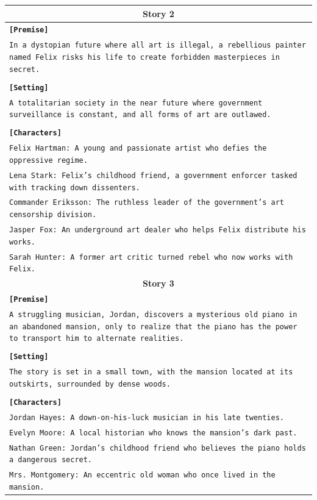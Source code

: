 \documentclass[letterpaper]{article} %
\begin{document}
\begin{small}
\begin{longtable}{p{\textwidth}}
    \multicolumn{1}{c}{\textbf{Story 2}} \\
    \midrule
    \texttt{\textbf{[Premise]}} \\
    \texttt{In a dystopian future where all art is illegal, a rebellious painter named Felix risks his life to create forbidden masterpieces in secret.} \\\\
    \texttt{\textbf{[Setting]}} \\
    \texttt{A totalitarian society in the near future where government surveillance is constant, and all forms of art are outlawed.} \\\\
    \texttt{\textbf{[Characters]}} \\
    \texttt{Felix Hartman: A young and passionate artist who defies the oppressive regime.} \\
    \texttt{Lena Stark: Felix's childhood friend, a government enforcer tasked with tracking down dissenters.} \\
    \texttt{Commander Eriksson: The ruthless leader of the government's art censorship division.} \\
    \texttt{Jasper Fox: An underground art dealer who helps Felix distribute his works.} \\
    \texttt{Sarah Hunter: A former art critic turned rebel who now works with Felix.} \\
    \midrule
  
    \multicolumn{1}{c}{\textbf{Story 3}} \\
    \midrule
    \texttt{\textbf{[Premise]}} \\
    \texttt{A struggling musician, Jordan, discovers a mysterious old piano in an abandoned mansion, only to realize that the piano has the power to transport him to alternate realities.} \\\\
    \texttt{\textbf{[Setting]}} \\
    \texttt{The story is set in a small town, with the mansion located at its outskirts, surrounded by dense woods.} \\\\
    \texttt{\textbf{[Characters]}} \\
    \texttt{Jordan Hayes: A down-on-his-luck musician in his late twenties.} \\
    \texttt{Evelyn Moore: A local historian who knows the mansion's dark past.} \\
    \texttt{Nathan Green: Jordan's childhood friend who believes the piano holds a dangerous secret.} \\
    \texttt{Mrs. Montgomery: An eccentric old woman who once lived in the mansion.} \\
    \midrule


\end{longtable}
\end{small}
\end{document}
